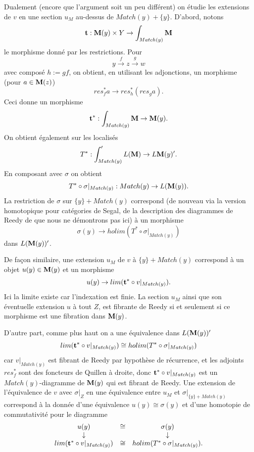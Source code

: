 \documentclass[12pt]{article}
\newcommand{\mm}{{\bf M}}
\begin{document}
Dualement (encore que l'argument soit un peu diff\'erent) on \'etudie les
extensions de
$v$ en une section $u_M$ au-dessus de $Match (y)+ \{ y\}$. D'abord, notons
$$
{\bf t}: \mm (y)\times Y \rightarrow \int _{Match (y)}\mm
$$
le morphisme donn\'e par les restrictions. Pour
$$
y\stackrel{f}{\rightarrow}z\stackrel{g}{\rightarrow}w
$$
avec compos\'e $h:= gf$, on obtient, en utilisant les adjonctions, un
morphisme (pour $a\in \mm (z)$)
$$
res_f^{\ast} a \rightarrow res _h^{\ast} (res_ga).
$$
Ceci donne un morphisme
$$
{\bf t}^{\ast} : \int _{Match (y)}\mm \rightarrow
\mm (y).
$$
On obtient \'egalement sur les localis\'es
$$
T^{\ast} : \int '_{Match (y)}L(\mm )\rightarrow
L\mm (y)'.
$$
En composant avec $\sigma$ on obtient
$$
T^{\ast}\circ \sigma |_{Match(y)}: Match(y)\rightarrow L(\mm (y)).
$$
La restriction de $\sigma$ sur $\{ y\} + Match(y)$ correspond
(de nouveau via
la version homotopique pour cat\'egories de Segal, de la description des
diagrammes de Reedy de \cite{Hirschhorn} \cite{DHK} que nous ne d\'emontrons pas
ici) \`a un morphisme
$$
\sigma (y) \rightarrow
holim (T^{\ast} \circ \sigma |_{Match(y)})
$$
dans $L(\mm (y))'$.

De fa\c{c}on similaire, une extension $u_M$ de $v$ \`a $\{ y\} + Match(y)$
correspond \`a un objet $u(y)\in \mm (y)$ et un morphisme
$$
u(y)\rightarrow lim ({\bf t}^{\ast} \circ v|_{Match(y)}).
$$
Ici la limite existe car l'indexation est finie.
La section $u_M$ ainsi que son \'eventuelle extension $u$ \`a tout $Z$, est
fibrante de Reedy si et seulement si ce morphisme est une fibration dans $\mm
(y)$.

D'autre part, comme plus haut on a une \'equivalence dans $L(\mm (y))'$
$$
lim ({\bf t}^{\ast} \circ v|_{Match(y)})\cong
holim (T^{\ast} \circ \sigma |_{Match(y)})
$$
car $v|_{Match(y)}$ est fibrant de Reedy par hypoth\`ese de r\'ecurrence, et les
adjoints $res _f^{\ast}$ sont des foncteurs de Quillen \`a droite, donc
${\bf t}^{\ast} \circ v|_{Match(y)}$ est un $Match(y)$-diagramme de $\mm (y)$
qui est
fibrant de Reedy. Une extension de l'\'equivalence de $v$ avec $\sigma |_Z$ en
une \'equivalence entre $u_M$ et $\sigma |_{\{ y\} + Match (y)}$ correspond
\`a la donn\'ee d'une \'equivalence $u(y)\cong \sigma (y)$ et d'une homotopie de
commutativit\'e pour le diagramme
$$
\begin{array}{ccc}
u(y) & \cong & \sigma (y) \\
\downarrow && \downarrow \\
lim ({\bf t}^{\ast} \circ v|_{Match(y)})& \cong &
holim (T^{\ast} \circ \sigma |_{Match(y)}).
\end{array}
$$
\end{document}
